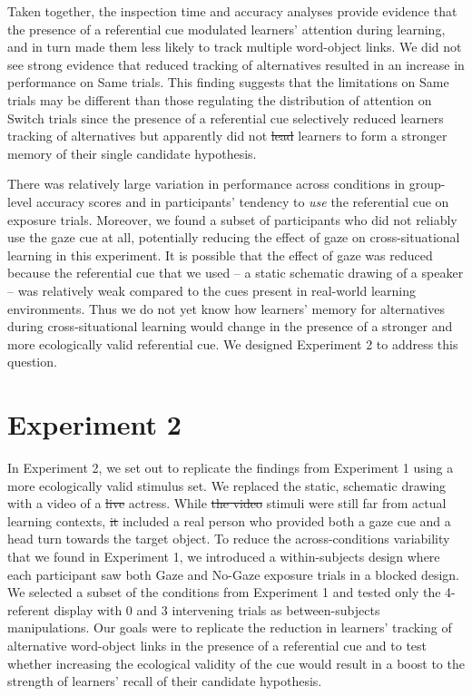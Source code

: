 \documentclass[authoryear, review]{elsarticle}
\providecommand{\DIFaddtex}[1]{{\protect\color{blue}\uwave{#1}}} %
\providecommand{\DIFdeltex}[1]{{\protect\color{red}\sout{#1}}}                      %
\providecommand{\DIFaddbegin}{} %
\providecommand{\DIFaddend}{} %
\providecommand{\DIFdelbegin}{} %
\providecommand{\DIFdelend}{} %
\providecommand{\DIFadd}[1]{\texorpdfstring{\DIFaddtex{#1}}{#1}} %
\providecommand{\DIFdel}[1]{\texorpdfstring{\DIFdeltex{#1}}{}} %
\begin{document}
Taken together, the inspection time and accuracy analyses provide
evidence that the presence of a referential cue modulated learners'
attention during learning, and in turn made them less likely to track
multiple word-object links. We did not see strong evidence that reduced
tracking of alternatives resulted in an increase in performance on Same
trials. This finding suggests that the limitations on Same trials may be
different than those regulating the distribution of attention on Switch
trials since the presence of a referential cue selectively reduced
learners tracking of alternatives but apparently did not \DIFdelbegin \DIFdel{lead }\DIFdelend \DIFaddbegin \DIFadd{cause }\DIFaddend learners
to form a stronger memory of their single candidate hypothesis.

There was relatively large variation in performance across conditions in
group-level accuracy scores and in participants' tendency to \emph{use}
the referential cue on exposure trials. Moreover, we found a subset of
participants who did not reliably use the gaze cue at all, potentially
reducing the effect of gaze on cross-situational learning in this
experiment. It is possible that the effect of gaze was reduced because
the referential cue that we used -- a static schematic drawing of a
speaker -- was relatively weak compared to the cues present in
real-world learning environments. Thus we do not yet know how learners'
memory for alternatives during cross-situational learning would change
in the presence of a stronger and more ecologically valid referential
cue. We designed Experiment 2 to address this question.

\section{Experiment 2}\label{experiment-2}

In Experiment 2, we set out to replicate the findings from Experiment 1
using a more ecologically valid stimulus set. We replaced the static,
schematic drawing with a video of a \DIFdelbegin \DIFdel{live }\DIFdelend \DIFaddbegin \DIFadd{female }\DIFaddend actress. While \DIFdelbegin \DIFdel{the video
}\DIFdelend \DIFaddbegin \DIFadd{these }\DIFaddend stimuli
were still far from actual learning contexts, \DIFdelbegin \DIFdel{it }\DIFdelend \DIFaddbegin \DIFadd{they }\DIFaddend included a real
person who provided both a gaze cue and a head turn towards the target
object. To reduce the across-conditions variability that we found in
Experiment 1, we introduced a within-subjects design where each
participant saw both Gaze and No-Gaze exposure trials in a blocked
design. We selected a subset of the conditions from Experiment 1 and
tested only the 4-referent display with 0 and 3 intervening trials as
between-subjects manipulations. Our goals were to replicate the
reduction in learners' tracking of alternative word-object links in the
presence of a referential cue and to test whether increasing the
ecological validity of the cue would result in a boost to the strength
of learners' recall of their candidate hypothesis.
\end{document}
